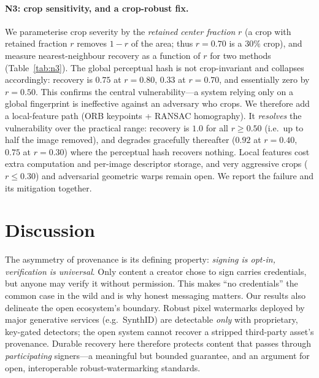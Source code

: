 \documentclass[11pt]{article}
\begin{document}
\paragraph{N3: crop sensitivity, and a crop-robust fix.} We parameterise crop severity by the
\emph{retained center fraction} $r$ (a crop with retained fraction $r$ removes $1-r$ of the
area; thus $r=0.70$ is a $30\%$ crop), and measure nearest-neighbour recovery as a function of
$r$ for two methods (Table~\ref{tab:n3}). The global perceptual hash is not crop-invariant and
collapses accordingly: recovery is $0.75$ at $r=0.80$, $0.33$ at $r=0.70$, and essentially
zero by $r=0.50$. This confirms the central vulnerability---a system relying only on a global
fingerprint is ineffective against an adversary who crops. We therefore add a local-feature
path (ORB keypoints + RANSAC homography). It \emph{resolves} the vulnerability over the
practical range: recovery is $1.0$ for all $r \ge 0.50$ (i.e.\ up to half the image removed),
and degrades gracefully thereafter ($0.92$ at $r=0.40$, $0.75$ at $r=0.30$) where the
perceptual hash recovers nothing. Local features cost extra computation and per-image
descriptor storage, and very aggressive crops ($r \le 0.30$) and adversarial geometric warps
remain open. We report the failure and its mitigation together.

\begin{table}[t]
\centering
\caption{N3 (Kodak): nearest-neighbour recovery rate vs.\ retained center fraction $r$ (each
crop followed by JPEG-$70$), for the global perceptual hash and the crop-robust ORB path.}
\label{tab:n3}

\end{table}

\section{Discussion}\label{sec:discussion}
The asymmetry of provenance is its defining property: \emph{signing is opt-in, verification
is universal}. Only content a creator chose to sign carries credentials, but anyone may
verify it without permission. This makes ``no credentials'' the common case in the wild and
is why honest messaging matters. Our results also delineate the open ecosystem's boundary.
Robust pixel watermarks deployed by major generative services (e.g.\ SynthID) are detectable
\emph{only} with proprietary, key-gated detectors; the open system cannot recover a stripped
third-party asset's provenance. Durable recovery here therefore protects content that passes
through \emph{participating} signers---a meaningful but bounded guarantee, and an argument for
open, interoperable robust-watermarking standards.
\end{document}
